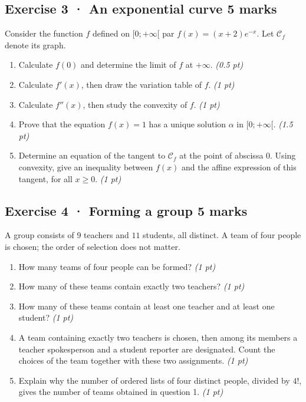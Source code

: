 \clearpage{}\par

\subsection*{Exercise 3 · An exponential curve \hfill 5 marks}Consider the function $f$ defined on $[0;+\infty[$ par $f(x)=(x+2)e^{-x}$. Let $\mathcal C_f$ denote its graph.

\begin{enumerate}

\item Calculate $f(0)$ and determine the limit of $f$ at $+\infty$. \hfill\textit{(0.5 pt)}

\item Calculate $f'(x)$, then draw the variation table of $f$. \hfill\textit{(1 pt)}

\item Calculate $f''(x)$, then study the convexity of $f$. \hfill\textit{(1 pt)}

\item Prove that the equation $f(x)=1$ has a unique solution $\alpha$ in $[0;+\infty[$. \hfill\textit{(1.5 pt)}

\item Determine an equation of the tangent to $\mathcal C_f$ at the point of abscissa $0$. Using convexity, give an inequality between $f(x)$ and the affine expression of this tangent, for all $x\ge0$. \hfill\textit{(1 pt)}

\end{enumerate}

\subsection*{Exercise 4 · Forming a group \hfill 5 marks}A group consists of $9$ teachers and $11$ students, all distinct. A team of four people is chosen; the order of selection does not matter.

\begin{enumerate}

\item How many teams of four people can be formed? \hfill\textit{(1 pt)}

\item How many of these teams contain exactly two teachers? \hfill\textit{(1 pt)}

\item How many of these teams contain at least one teacher and at least one student? \hfill\textit{(1 pt)}

\item A team containing exactly two teachers is chosen, then among its members a teacher spokesperson and a student reporter are designated. Count the choices of the team together with these two assignments. \hfill\textit{(1 pt)}

\item Explain why the number of ordered lists of four distinct people, divided by $4!$, gives the number of teams obtained in question 1. \hfill\textit{(1 pt)}

\end{enumerate}


